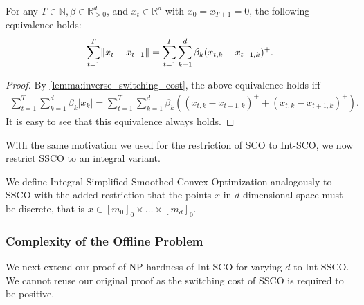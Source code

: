 \begin{lemma}
For any $T \in \mathbb{N}, \beta \in \mathbb{R}_{>0}^d$, and $x_t \in \mathbb{R}^d$ with $x_0 = x_{T+1} = 0$, the following equivalence holds:
\begin{align*}
    \sum_{t=1}^T \lVert x_t - x_{t-1}\rVert = \sum_{t=1}^T \sum_{k=1}^d \beta_k (x_{t,k} - x_{t-1,k})^+.
\end{align*}
\end{lemma}
\begin{proof}
By \autoref{lemma:inverse_switching_cost}, the above equivalence holds iff \begin{align*}
    \sum_{t=1}^T \sum_{k=1}^d \beta_k |x_k| = \sum_{t=1}^T \sum_{k=1}^d \beta_k ((x_{t,k} - x_{t-1,k})^+ + (x_{t,k} - x_{t+1,k})^+).
\end{align*}
It is easy to see that this equivalence always holds.
\end{proof}

With the same motivation we used for the restriction of SCO to Int-SCO, we now restrict SSCO to an integral variant.

\begin{problem}
We define Integral Simplified Smoothed Convex Optimization analogously to SSCO with the added restriction that the points $x$ in $d$-dimensional space must be discrete, that is $x \in [m_0]_0 \times \dots \times [m_d]_0$.
\end{problem}

\subsubsection{Complexity of the Offline Problem}

We next extend our proof of NP-hardness of Int-SCO for varying $d$ to Int-SSCO. We cannot reuse our original proof as the switching cost of SSCO is required to be positive.

